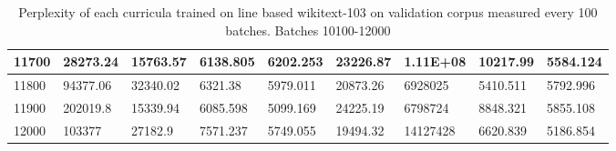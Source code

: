 \documentclass [11pt, proquest] {uwthesis}[2020/12/20]
\begin{document}
\begin{table}
\begin{tiny}
\begin{tabular}{|l|l|l|l|l|l|l|l|l|}
11700 & 28273.24 & 15763.57 & 6138.805 & 6202.253 & 23226.87 & 1.11E+08 & 10217.99 & 5584.124 \\\hline
11800 & 94377.06 & 32340.02 & 6321.38 & 5979.011 & 20873.26 & 6928025 & 5410.511 & 5792.996 \\\hline
11900 & 202019.8 & 15339.94 & 6085.598 & 5099.169 & 24225.19 & 6798724 & 8848.321 & 5855.108 \\\hline
12000 & 103377 & 27182.9 & 7571.237 & 5749.055 & 19494.32 & 14127428 & 6620.839 & 5186.854 \\\hline
\end{tabular}
\end{tiny}
\caption{Perplexity of each curricula trained on line based wikitext-103 on validation corpus measured every 100 batches. Batches 10100-12000}
\label{tab:wikitext-103-line-3}
\end{table}
\end{document}
